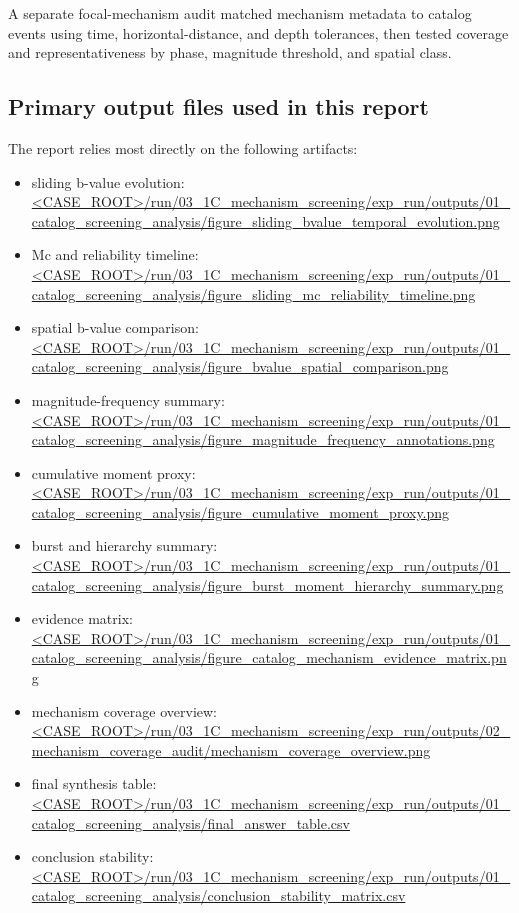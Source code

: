 \documentclass[11pt]{article}
\begin{document}
A separate focal-mechanism audit matched mechanism metadata to catalog events using time, horizontal-distance, and depth tolerances, then tested coverage and representativeness by phase, magnitude threshold, and spatial class.

\subsection{Primary output files used in this report}
The report relies most directly on the following artifacts:
\begin{itemize}[leftmargin=2em]
    \item sliding b-value evolution: \url{<CASE_ROOT>/run/03_1C_mechanism_screening/exp_run/outputs/01_catalog_screening_analysis/figure_sliding_bvalue_temporal_evolution.png}
    \item Mc and reliability timeline: \url{<CASE_ROOT>/run/03_1C_mechanism_screening/exp_run/outputs/01_catalog_screening_analysis/figure_sliding_mc_reliability_timeline.png}
    \item spatial b-value comparison: \url{<CASE_ROOT>/run/03_1C_mechanism_screening/exp_run/outputs/01_catalog_screening_analysis/figure_bvalue_spatial_comparison.png}
    \item magnitude-frequency summary: \url{<CASE_ROOT>/run/03_1C_mechanism_screening/exp_run/outputs/01_catalog_screening_analysis/figure_magnitude_frequency_annotations.png}
    \item cumulative moment proxy: \url{<CASE_ROOT>/run/03_1C_mechanism_screening/exp_run/outputs/01_catalog_screening_analysis/figure_cumulative_moment_proxy.png}
    \item burst and hierarchy summary: \url{<CASE_ROOT>/run/03_1C_mechanism_screening/exp_run/outputs/01_catalog_screening_analysis/figure_burst_moment_hierarchy_summary.png}
    \item evidence matrix: \url{<CASE_ROOT>/run/03_1C_mechanism_screening/exp_run/outputs/01_catalog_screening_analysis/figure_catalog_mechanism_evidence_matrix.png}
    \item mechanism coverage overview: \url{<CASE_ROOT>/run/03_1C_mechanism_screening/exp_run/outputs/02_mechanism_coverage_audit/mechanism_coverage_overview.png}
    \item final synthesis table: \url{<CASE_ROOT>/run/03_1C_mechanism_screening/exp_run/outputs/01_catalog_screening_analysis/final_answer_table.csv}
    \item conclusion stability: \url{<CASE_ROOT>/run/03_1C_mechanism_screening/exp_run/outputs/01_catalog_screening_analysis/conclusion_stability_matrix.csv}
\end{itemize}
\end{document}
